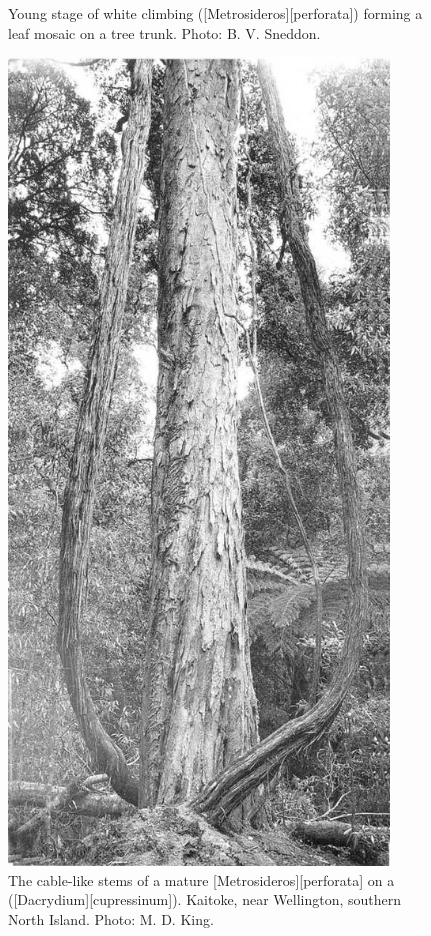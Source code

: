 \begin{figure}[!htb]
\begin{minipage}[t]{0.454\textwidth}
    	\caption[Young stage of white climbing rata]{Young stage of white climbing  ([Metrosideros][perforata]) forming a leaf mosaic on a tree trunk. Photo: B. V. Sneddon.}%
    	\label{fig:30rata}
	\end{minipage}\hfill%
	\begin{minipage}[t]{0.526\textwidth}
    	\centering
    	\includegraphics[width=0.9\textwidth]{graphics/figure31perforata.jpg}
    	\caption[A mature \emph{Metrosideros perforata} on a rimu]{The cable-like stems of a mature [Metrosideros][perforata] on a  ([Dacrydium][cupressinum]). Kaitoke, near Wellington, southern North Island. Photo: M. D. King.}%
    	\label{fig:31perforata}
	\end{minipage}
\end{figure}

